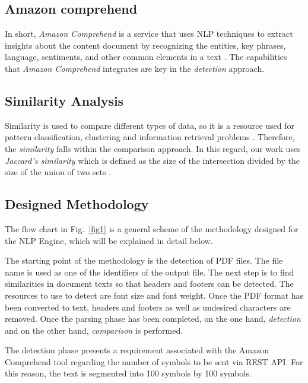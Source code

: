 \documentclass[conference]{style/IEEEtran}
\begin{document}
\subsection{Amazon comprehend}
In short, \textit{Amazon Comprehend} is a service that uses NLP techniques to extract insights about the content document by recognizing  the  entities,  key  phrases,  language,  sentiments,  and  other  common  elements  in  a  text \cite{AWS2021}. The capabilities that \textit{Amazon Comprehend} integrates are key in the \textit{detection} approach.

\subsection{Similarity Analysis}
Similarity is used to compare different types of data, so it is a resource used for pattern classification, clustering and information retrieval problems \cite{7429408}. Therefore, the \textit{similarity} falls within the comparison approach. In this regard, our work uses  \textit{Jaccard's similarity} which is defined as the size of the intersection divided by the size of the union of two sets \cite{Gupta2018}.

\subsection{Designed Methodology}
The flow chart in Fig.~\ref{fig1} is a general scheme of the methodology designed for the NLP Engine, which will be explained in detail below.

The starting point of the methodology is the detection of PDF files. The file name is used as one of the identifiers of the output file. The next step is to find similarities in document texts so that headers and footers can be detected. The resources to use to detect are font size and font weight. Once the PDF format has been converted to text, headers and footers as well as undesired characters are removed. Once the parsing phase has been completed, on the one hand, \textit{detection} and on the other hand, \textit{comparison} is performed.

The detection phase presents a requirement associated with the Amazon Comprehend tool regarding the number of symbols to be sent via REST API. For this reason, the text is segmented into 100 symbols by 100 symbols.
\end{document}
